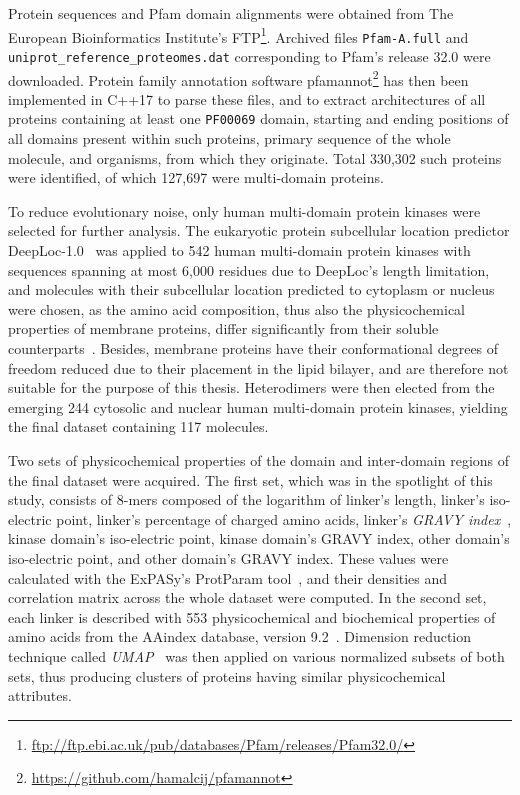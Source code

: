 \label{methods}

Protein sequences and Pfam domain alignments were obtained from The European
Bioinformatics Institute's
FTP\footnote{\url{ftp://ftp.ebi.ac.uk/pub/databases/Pfam/releases/Pfam32.0/}}.
Archived files \texttt{Pfam-A.full} and \texttt{uniprot\_reference\_proteomes.dat}
corresponding to Pfam's release 32.0 were downloaded.
Protein family annotation software
pfamannot\footnote{\url{https://github.com/hamalcij/pfamannot}} has then been implemented
in C++17 to parse these files, and to extract architectures of all proteins containing at
least one \texttt{PF00069} domain, starting and ending positions of all domains present
within such proteins, primary sequence of the whole molecule, and organisms, from which
they originate.
Total 330,302 such proteins were identified, of which 127,697 were multi-domain proteins.

To reduce evolutionary noise, only human multi-domain protein kinases were selected for
further analysis.
The eukaryotic protein subcellular location predictor
DeepLoc-1.0~\cite{almagro2017deeploc} was applied to 542 human multi-domain protein
kinases with sequences spanning at most 6,000 residues due to DeepLoc's length limitation,
and molecules with their subcellular location predicted to cytoplasm or nucleus were
chosen, as the amino acid composition, thus also the physicochemical properties of
membrane proteins, differ significantly from their soluble
counterparts~\cite{capaldi1972low, von1988topogenic, tusnady1998principles}.
Besides, membrane proteins have their conformational degrees of freedom reduced due to
their placement in the lipid bilayer, and are therefore not suitable for the purpose of
this thesis.
Heterodimers were then elected from the emerging 244 cytosolic and nuclear human
multi-domain protein kinases, yielding the final dataset containing 117 molecules.

Two sets of physicochemical properties of the domain and inter-domain regions of the final
dataset were acquired.
The first set, which was in the spotlight of this study, consists of 8-mers composed of
the logarithm of linker's length, linker's iso-electric point, linker's percentage of
charged amino acids, linker's \emph{GRAVY index}~\cite{kyte1982simple}, kinase domain's
iso-electric point, kinase domain's GRAVY index, other domain's iso-electric point, and
other domain's GRAVY index.
These values were calculated with the ExPASy's ProtParam tool~\cite{gasteiger2005protein},
and their densities and correlation matrix across the whole dataset were computed.
In the second set, each linker is described with 553 physicochemical and
biochemical properties of amino acids from the AAindex database, version
9.2~\cite{nakai1988cluster, tomii1996analysis, kawashima1999aaindex, kawashima2000aaindex,
kawashima2007aaindex}.
Dimension reduction technique called \emph{UMAP}~\cite{mcinnes2018umap} was then applied
on various normalized subsets of both sets, thus producing clusters of proteins having
similar physicochemical attributes.

